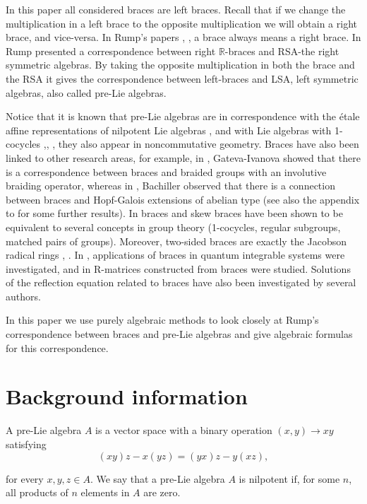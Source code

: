 \documentclass[12pt]{article}
\begin{document}
 In this paper all considered braces are left braces. Recall that if we change the multiplication in a left brace to the opposite multiplication we will obtain a right brace, and vice-versa. In  Rump's papers \cite{rump}, \cite{Rump},  a brace always means a right brace. In  \cite{Rump} Rump presented a correspondence between right  $\mathbb R$-braces and RSA-the right symmetric algebras. By taking the opposite multiplication in both the brace and the RSA it gives the correspondence between
 left-braces and LSA, left symmetric algebras, also called pre-Lie algebras.

 Notice that it is known that pre-Lie algebras are in correspondence with the {\' e}tale  affine representations of nilpotent Lie algebras \cite{B2}, and with Lie algebras with 1-cocycles \cite{Rump},\cite{Bai}, \cite{Burde}, they also appear in noncommutative geometry. 
Braces have also been linked to other
research areas, for example, in \cite{gateva}, Gateva-Ivanova showed that there is a correspondence between
braces and braided groups with an involutive braiding operator, whereas in \cite{DB}, Bachiller observed that
there is a connection between braces and Hopf-Galois extensions of abelian type (see
also the appendix to \cite{SVB} for some further results). In \cite{Rump, DB, Catino, gateva, SVB} braces and skew braces have been shown to be equivalent  to several concepts in group theory (1-cocycles, regular subgroups, matched pairs of groups). Moreover, two-sided braces are exactly
the Jacobson radical rings \cite{rump}, \cite{cjo}. In \cite{doikou}, applications of braces in quantum integrable
systems were investigated, and in \cite{Agatka1} R-matrices constructed from braces were studied.
Solutions of the reflection equation related to braces have also been investigated by several
authors. 



In this paper we use purely algebraic methods to look closely at Rump's correspondence between braces and pre-Lie algebras and give algebraic formulas for this correspondence.

\section{Background information}


 A pre-Lie algebra $A$ is a vector space with a binary operation $(x, y) \rightarrow  xy$
satisfying
\[(xy)z -x(yz) = (yx)z - y(xz),\]

 for every $x,y,z\in A$. We say that a pre-Lie algebra $A$  is nilpotent if, for some $n$, all products of $n$ elements in $A$ are zero.
\end{document}
